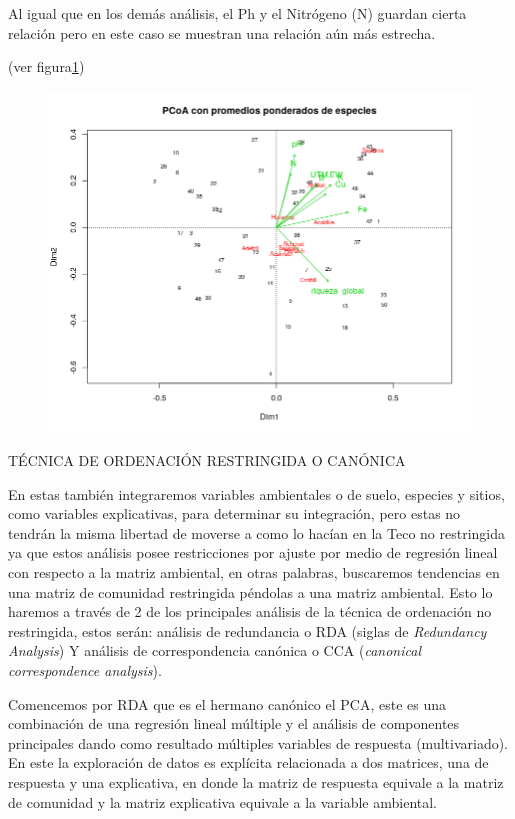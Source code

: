 \documentclass[11pt,]{article}
\begin{document}
Al igual que en los demás análisis, el Ph y el Nitrógeno (N) guardan
cierta relación pero en este caso se muestran una relación aún más
estrecha.

(ver figura\ref{fig:PCoA})

\begin{figure}
\centering
\includegraphics{PCoA.png}
\caption{\label{fig:PCoA}}
\end{figure}

TÉCNICA DE ORDENACIÓN RESTRINGIDA O CANÓNICA

En estas también integraremos variables ambientales o de suelo, especies
y sitios, como variables explicativas, para determinar su integración,
pero estas no tendrán la misma libertad de moverse a como lo hacían en
la Teco no restringida ya que estos análisis posee restricciones por
ajuste por medio de regresión lineal con respecto a la matriz ambiental,
en otras palabras, buscaremos tendencias en una matriz de comunidad
restringida péndolas a una matriz ambiental. Esto lo haremos a través de
2 de los principales análisis de la técnica de ordenación no
restringida, estos serán: análisis de redundancia o RDA (siglas de
\emph{Redundancy Analysis}) Y análisis de correspondencia canónica o CCA
(\emph{canonical correspondence analysis}).

Comencemos por RDA que es el hermano canónico el PCA, este es una
combinación de una regresión lineal múltiple y el análisis de
componentes principales dando como resultado múltiples variables de
respuesta (multivariado). En este la exploración de datos es explícita
relacionada a dos matrices, una de respuesta y una explicativa, en donde
la matriz de respuesta equivale a la matriz de comunidad y la matriz
explicativa equivale a la variable ambiental.
\end{document}
